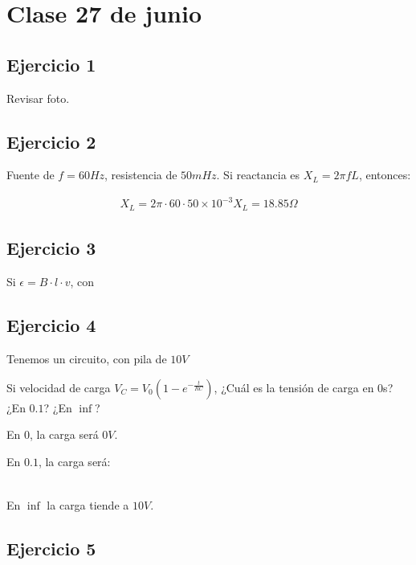 \section{Clase 27 de junio}

\subsection{Ejercicio 1}

Revisar foto.

\subsection{Ejercicio 2}

Fuente de \(f = 60 Hz\), resistencia de \(50 mHz\).
Si reactancia es \(X_L = 2\pi f L\), entonces:

\begin{align*}
    X_L = 2\pi \cdot 60 \cdot 50 \times 10^{-3}
    \boxed{X_L = 18.85 \Omega}
\end{align*}

\subsection{Ejercicio 3}

Si \(\epsilon = B\cdot l \cdot v\),
con 

\subsection{Ejercicio 4}

Tenemos un circuito, con pila de \(10V\)

Si velocidad de carga \(V_C = V_0(1-e^{-\frac{t}{RC}})\),
¿Cuál es la tensión de carga en 0s? ¿En \(0.1\)? ¿En \(\inf\)?

En 0, la carga será \(\boxed{0 V}\).

En \(0.1\), la carga será:

\begin{align*}
    
\end{align*}

En \(\inf\) la carga tiende a \(10 V\).

\subsection{Ejercicio 5}

